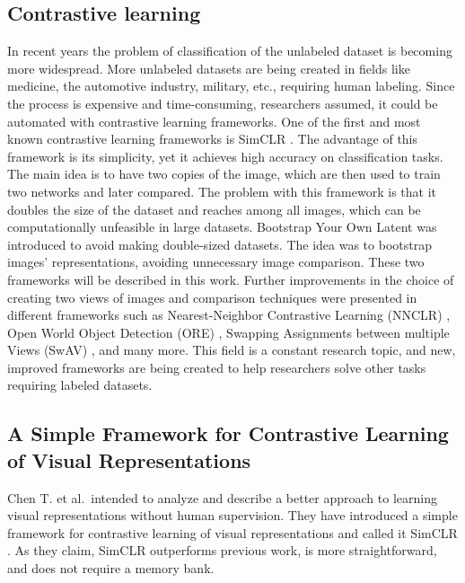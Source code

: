 \documentclass[
]{krantz}
\begin{document}
\hypertarget{contrastive-learning}{%
\subsection{Contrastive learning}\label{contrastive-learning}}

In recent years the problem of classification of the unlabeled dataset is becoming more widespread. More unlabeled datasets are being created in fields like medicine, the automotive industry, military, etc., requiring human labeling. Since the process is expensive and time-consuming, researchers assumed, it could be automated with contrastive learning frameworks. One of the first and most known contrastive learning frameworks is SimCLR \citet{SimCLR}. The advantage of this framework is its simplicity, yet it achieves high accuracy on classification tasks. The main idea is to have two copies of the image, which are then used to train two networks and later compared. The problem with this framework is that it doubles the size of the dataset and reaches among all images, which can be computationally unfeasible in large datasets. Bootstrap Your Own Latent \citet{BYOL} was introduced to avoid making double-sized datasets. The idea was to bootstrap images' representations, avoiding unnecessary image comparison. These two frameworks will be described in this work.
Further improvements in the choice of creating two views of images and comparison techniques were presented in different frameworks such as Nearest-Neighbor Contrastive Learning (NNCLR) \citet{NNCLR}, Open World Object Detection (ORE) \citet{ORE}, Swapping Assignments between multiple Views (SwAV) \citet{SwAV}, and many more.
This field is a constant research topic, and new, improved frameworks are being created to help researchers solve other tasks requiring labeled datasets.

\hypertarget{a-simple-framework-for-contrastive-learning-of-visual-representations}{%
\subsection{A Simple Framework for Contrastive Learning of Visual Representations}\label{a-simple-framework-for-contrastive-learning-of-visual-representations}}

Chen T. et al.~intended to analyze and describe a better approach to learning visual representations without human supervision. They have introduced a simple framework for contrastive learning of visual representations and called it SimCLR \citet{SimCLR}. As they claim, SimCLR outperforms previous work, is more straightforward, and does not require a memory bank.
\end{document}
